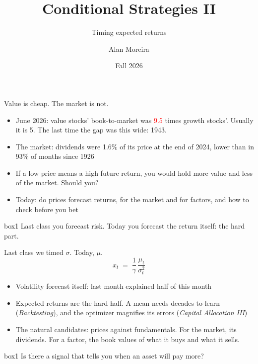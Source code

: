 \documentclass[aspectratio=169,10pt]{beamer}
\title{Conditional Strategies II}
\subtitle{Timing expected returns}
\author[A. Moreira]{Alan Moreira}
\institute[Data-Driven Investing]{NYU Stern --- Data-Driven Investing}
\date{Fall 2026}
\begin{document}
\begin{frame}
\titlepage
\end{frame}

\begin{frame}{Value is cheap. The market is not.}
\vskip 6pt
\begin{itemize}
\item June 2026: value stocks' book-to-market was \textcolor{red}{9.5} times growth stocks'. Usually it is 5. The last time the gap was this wide: 1943.
\vskip 8pt
\item The market: dividends were 1.6\% of its price at the end of 2024, lower than in 93\% of months since 1926
\vskip 8pt
\item If a low price means a high future return, you would hold more value and less of the market. Should you?
\vskip 8pt
\item Today: do prices forecast returns, for the market and for factors, and how to check before you bet
\end{itemize}
\vskip 14pt
\begin{beamercolorbox}[rounded=true,sep=7pt,center]{box1}
Last class you forecast risk. Today you forecast the return itself: the hard part.
\end{beamercolorbox}
\end{frame}

\begin{frame}{Last class we timed $\sigma$. Today, $\mu$.}
\[ x_{t} \;=\; \frac{1}{\gamma}\,\frac{\mu_{t}}{\sigma_{t}^{2}} \]
\vskip 4pt
\begin{itemize}
\item Volatility forecast itself: last month explained half of this month
\vskip 8pt
\item Expected returns are the hard half. A mean needs decades to learn (\emph{Backtesting}), and the optimizer magnifies its errors (\emph{Capital Allocation III})
\vskip 8pt
\item The natural candidates: prices against fundamentals. For the market, its dividends. For a factor, the book values of what it buys and what it sells.
\end{itemize}
\vskip 14pt
\begin{beamercolorbox}[rounded=true,sep=7pt,center]{box1}
Is there a signal that tells you when an asset will pay more?
\end{beamercolorbox}
\end{frame}
\end{document}

